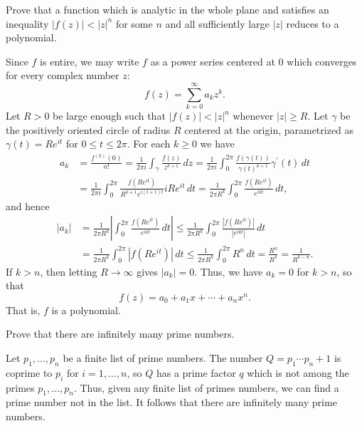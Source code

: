\documentclass[a4paper,11pt]{ltjsarticle} %
\begin{document}
\begin{problem}[Ahlfors \S4.2.3 \#2, p. 123]
Prove that a function which is analytic in the whole plane and satisfies an
inequality $|f(z)| < |z|^n$ for some $n$ and all sufficiently large $|z|$
reduces to a polynomial.
\end{problem}

\begin{solution}
Since $f$ is entire, we may write $f$ as a power series centered at $0$ which
converges for every complex number $z$:
\begin{equation*}
f(z) = \sum_{k=0}^\infty a_k z^k.
\end{equation*}
Let $R > 0$ be large enough such that $|f(z)| < |z|^n$ whenever $|z| \geq R$.
Let $\gamma$ be the positively oriented circle of radius $R$ centered at the
origin, parametrized as $\gamma(t) = R e^{i t}$ for $0 \leq t \leq 2\pi$.
For each $k \geq 0$ we have
\begin{align*}
a_k
&= \frac{f^{(k)}(0)}{n!}
= \frac{1}{2 \pi i} \int_\gamma \frac{f(z)}{z^{k+1}} \, dz
= \frac{1}{2 \pi i} \int_0^{2\pi} \frac{f(\gamma(t))}{\gamma(t)^{k+1}} \gamma^\prime(t) \, dt
\\&= \frac{1}{2 \pi i} \int_0^{2\pi} \frac{f(R e^{i t})}{R^{k+1} e^{i(t+1) t}} i R e^{i t} \, dt
= \frac{1}{2 \pi R^k} \int_0^{2\pi} \frac{f(R e^{i t})}{e^{i k t}} \, dt,
\end{align*}
and hence
\begin{align*}
|a_k|
&= \frac{1}{2 \pi R^k} \left|\int_0^{2\pi} \frac{f(R e^{i t})}{e^{i k t}} \, dt\right|
\leq \frac{1}{2 \pi R^k} \int_0^{2\pi} \frac{|f(R e^{i t})|}{|e^{i k t}|} \, dt
\\&= \frac{1}{2 \pi R^k} \int_0^{2\pi} |f(R e^{i t})| \, dt
\leq \frac{1}{2 \pi R^k} \int_0^{2\pi} R^n \, dt
= \frac{R^n}{R^k}
= \frac{1}{R^{k - n}}.
\end{align*}
If $k > n$, then letting $R \to \infty$ gives $|a_k| = 0$.
Thus, we have $a_k = 0$ for $k > n$, so that
\begin{equation*}
f(z) = a_0 + a_1 x + \cdots + a_n x^n.
\end{equation*}
That is, $f$ is a polynomial.
\end{solution}

\begin{problem}
Prove that there are infinitely many prime numbers.
\end{problem}

\begin{solution}
Let $p_1,\ldots,p_n$ be a finite list of prime numbers.
The number $Q = p_1\cdots p_n + 1$ is coprime to $p_i$ for $i=1,\ldots,n$, so
$Q$ has a prime factor $q$ which is not among the primes $p_1, \ldots, p_n$.
Thus, given any finite list of primes numbers, we can find a prime number not in
the list.
It follows that there are infinitely many prime numbers.
\end{solution}
\end{document}

